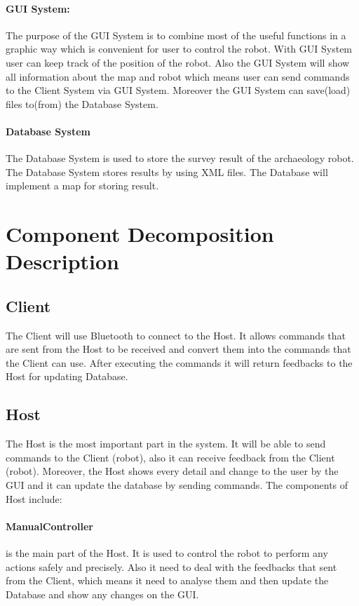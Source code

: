 \documentclass[11pt, a4paper]{report}
\begin{document}
\paragraph{GUI System: }The purpose of the GUI System is to combine most of the useful functions in a graphic way which is convenient for user to control the robot. With GUI System user can keep track of the position of the robot. Also the GUI System will show all information about the map and robot which means user can send commands to the Client System via GUI System. Moreover the GUI System can save(load) files to(from) the Database System.
\newline
\paragraph{Database System}The Database System is used to store the survey result of the archaeology robot. The Database System stores results by using XML files. The Database will implement a map for storing result.


\section{Component Decomposition Description}
\subsection{Client} The Client will use Bluetooth to connect to the Host. It allows commands that are sent from the Host to be received and convert them into the commands that the Client can use. After executing the commands it will return feedbacks to the Host for updating Database.
\subsection{Host} The Host is the most important part in the system. It will be able to send commands to the Client (robot), also it can receive feedback from the Client (robot). Moreover, the Host shows every detail and change to the user by the GUI and it can update the database by sending commands. The components of Host include:
\paragraph{ManualController} is the main part of the Host. It is used to control the robot to perform any actions safely and precisely. Also it need to deal with the feedbacks that sent from the Client, which means it need to analyse them and then update the Database and show any changes on the GUI.
\end{document}
